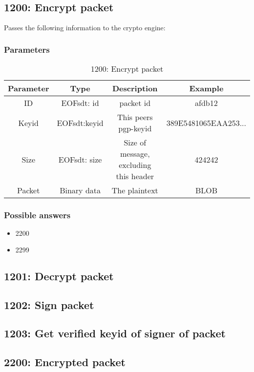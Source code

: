 \documentclass[12pt,a4paper]{book}
\begin{document}
\subsection{1200: Encrypt packet}
Passes the following information to the crypto engine:
\subsubsection{Parameters}
\begin{longtable}{|c|c|c|c|}
\caption{1200: Encrypt packet}\\
\hline
\textbf{Parameter} & \textbf{Type} & \textbf{Description} & \textbf{Example}\\
\hline
ID & EOFsdt: id & packet id & afdb12\\
\hline
Keyid & EOFsdt:keyid & This peers pgp-keyid & 389E5481065EAA253...\\
\hline
Size & EOFsdt: size & Size of message, excluding this header & 424242\\
\hline
Packet & Binary data & The plaintext & BLOB\\
\hline
\end{longtable}

\subsubsection{Possible answers}
\begin{itemize}
\item 2200
\item 2299
\end{itemize}
\subsection{1201: Decrypt packet}
\subsection{1202: Sign packet}
\subsection{1203: Get verified keyid of signer of packet}
\subsection{2200: Encrypted packet}
\end{document}
